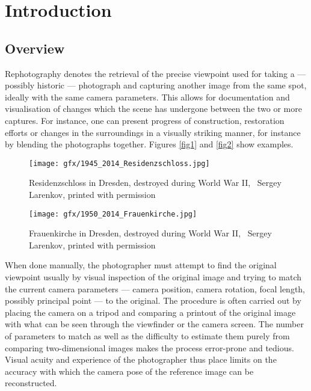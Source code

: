 \chapter{Introduction}

\section{Overview}

Rephotography denotes the retrieval of the precise viewpoint used for taking a
--- possibly historic --- photograph and capturing another image from the same
spot, ideally with the same camera parameters. This allows for
documentation and visualisation of changes which the scene has undergone between
the two or more captures.  For instance, one can present progress of
construction, restoration efforts or changes in the surroundings in a visually
striking manner, for instance by blending the photographs together. 
Figures \autoref{fig1} and \autoref{fig2} show examples.

\begin{figure}
   \texttt{[image: gfx/1945\_2014\_Residenzschloss.jpg]}
   \caption{Residenzschloss in Dresden, destroyed during World War II,
   \textcopyright\ Sergey Larenkov, printed with permission}
   \label{fig1}
\end{figure}

\begin{figure}
   \texttt{[image: gfx/1950\_2014\_Frauenkirche.jpg]}
   \caption{Frauenkirche in Dresden, destroyed during World War II,
   \textcopyright\ Sergey Larenkov, printed with permission}
   \label{fig2}
\end{figure}

When done manually, the photographer must attempt to find the original viewpoint 
usually by visual inspection of the original image and trying to match the
current camera parameters --- camera position, camera rotation, focal length,
possibly principal point --- to the original.
The procedure is often carried out by placing the camera on a tripod and
comparing a printout of the original image with what can be seen through the
viewfinder or the camera screen. The number of parameters to match as well as
the difficulty to estimate them purely from comparing two-dimensional images makes the process
error-prone and tedious. Visual acuity and experience of the photographer thus
place limits on the accuracy with which the camera pose of the reference image
can be reconstructed. 


